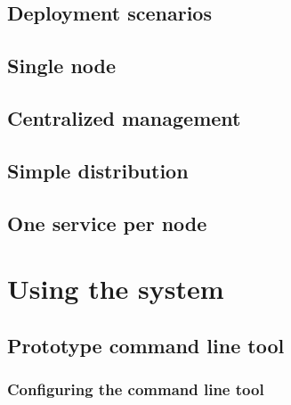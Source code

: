 \documentclass{book}
\begin{document}


\section{Deployment scenarios} %
\label{sec:deployment_scenarios}


\section{Single node} %
\label{sec:single_node}


\section{Centralized management} %
\label{sec:centralized_management}


\section{Simple distribution} %
\label{sec:simple_distribution}


\section{One service per node} %
\label{sec:one_service_per_node}



\chapter{Using the system} %
\label{cha:using_the_system}

\section{Prototype command line tool} %
\label{sec:prototype_command_line_tool}

\subsection{Configuring the command line tool} %
\label{sub:configuring_the_command_line_tool}
\end{document}
